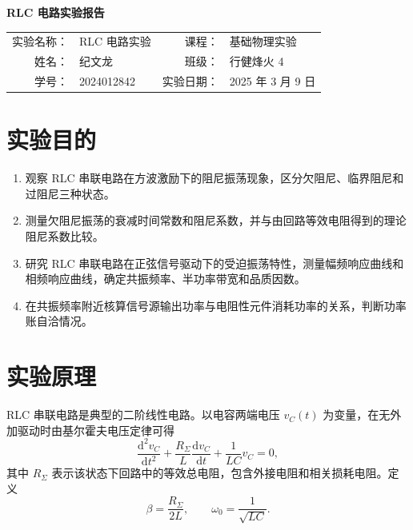 ﻿\documentclass[UTF8,12pt,a4paper]{ctexart}
\numberwithin{equation}{section}
\begin{document}
\begin{center}
    {\bfseries RLC 电路实验报告}
\end{center}

\vspace{0.5em}

\begin{center}
\begin{tabular}{rlrl}
实验名称： & RLC 电路实验 & 课程： & 基础物理实验 \\
姓名： & 纪文龙 & 班级： & 行健烽火 4 \\
学号： & 2024012842 & 实验日期： & 2025 年 3 月 9 日 \\
\end{tabular}
\end{center}

\section{实验目的}

\begin{enumerate}[label=\arabic*.,leftmargin=2.2em]
    \item 观察 RLC 串联电路在方波激励下的阻尼振荡现象，区分欠阻尼、临界阻尼和过阻尼三种状态。
    \item 测量欠阻尼振荡的衰减时间常数和阻尼系数，并与由回路等效电阻得到的理论阻尼系数比较。
    \item 研究 RLC 串联电路在正弦信号驱动下的受迫振荡特性，测量幅频响应曲线和相频响应曲线，确定共振频率、半功率带宽和品质因数。
    \item 在共振频率附近核算信号源输出功率与电阻性元件消耗功率的关系，判断功率账自洽情况。
\end{enumerate}

\section{实验原理}

RLC 串联电路是典型的二阶线性电路。以电容两端电压 \(v_C(t)\) 为变量，在无外加驱动时由基尔霍夫电压定律可得
\begin{equation}
    \frac{\mathrm{d}^2 v_C}{\mathrm{d}t^2}
    +\frac{R_\Sigma}{L}\frac{\mathrm{d}v_C}{\mathrm{d}t}
    +\frac{1}{LC}v_C=0,
\end{equation}
其中 \(R_\Sigma\) 表示该状态下回路中的等效总电阻，包含外接电阻和相关损耗电阻。定义
\begin{equation}
    \beta=\frac{R_\Sigma}{2L},\qquad
    \omega_0=\frac{1}{\sqrt{LC}}.
\end{equation}
\end{document}
